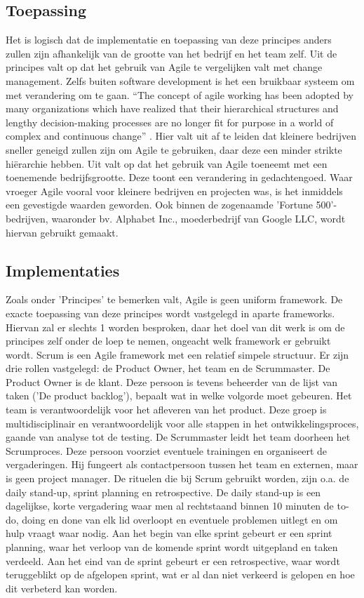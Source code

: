 \subsection{Toepassing}
Het is logisch dat de implementatie en toepassing van deze principes anders zullen zijn afhankelijk van de grootte van het bedrijf en het team zelf. Uit de principes valt op dat het gebruik van Agile te vergelijken valt met change management. Zelfs buiten software development is het een bruikbaar systeem om met verandering om te gaan. 
``The concept of agile working has been adopted by many organizations which have realized that their hierarchical structures and lengthy decision-making processes are no longer fit for purpose in a world of complex and continuous change'' \autocite{Franklin2014}. Hier valt uit af te leiden dat kleinere bedrijven sneller geneigd zullen zijn om Agile te gebruiken, daar deze een minder strikte hiërarchie hebben. Uit \textcite{Salo2008} valt op dat het gebruik van Agile toeneemt met een toenemende bedrijfsgrootte. Deze toont een verandering in gedachtengoed. Waar vroeger Agile vooral voor kleinere bedrijven en projecten was, is het inmiddels een gevestigde waarden geworden. Ook binnen de zogenaamde 'Fortune 500'-bedrijven, waaronder bv. Alphabet Inc., moederbedrijf van Google LLC, wordt hiervan gebruikt gemaakt. 

\subsection{Implementaties}
Zoals onder 'Principes' te bemerken valt, Agile is geen uniform framework. De exacte toepassing van deze principes wordt vastgelegd in aparte frameworks. Hiervan zal er slechts 1 worden besproken, daar het doel van dit werk is om de principes zelf onder de loep te nemen, ongeacht welk framework er gebruikt wordt.
Scrum is een Agile framework met een relatief simpele structuur. Er zijn drie rollen vastgelegd: de Product Owner, het team en de Scrummaster. De Product Owner is de klant. Deze persoon is tevens beheerder van de lijst van taken ('De product backlog'), bepaalt wat in welke volgorde moet gebeuren. Het team is verantwoordelijk voor het afleveren van het product. Deze groep is multidisciplinair en verantwoordelijk voor alle stappen in het ontwikkelingsproces, gaande van analyse tot de testing. De Scrummaster leidt het team doorheen het Scrumproces. Deze persoon voorziet eventuele trainingen en organiseert de vergaderingen. Hij fungeert als contactpersoon tussen het team en externen, maar is geen project manager.
De rituelen die bij Scrum gebruikt worden, zijn o.a. de daily stand-up, sprint planning en retrospective. De daily stand-up is een dagelijkse, korte vergadering waar men al rechtstaand binnen 10 minuten de to-do, doing en done van elk lid overloopt en eventuele problemen uitlegt en om hulp vraagt waar nodig. Aan het begin van elke sprint gebeurt er een sprint planning, waar het verloop van de komende sprint wordt uitgepland en taken verdeeld. Aan het eind van de sprint gebeurt er een retrospective, waar wordt teruggeblikt op de afgelopen sprint, wat er al dan niet verkeerd is gelopen en hoe dit verbeterd kan worden.


